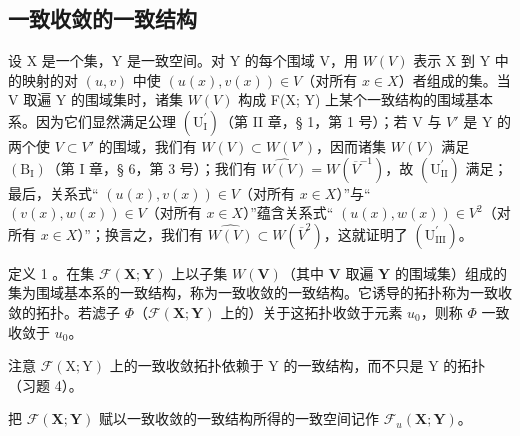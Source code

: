 \subsection{一致收敛的一致结构}

设 X 是一个集，Y 是一致空间。对 Y 的每个围域 V，用 \(W(V)\) 表示 X 到 Y 中的映射的对 \((u, v)\) 中使 \((u(x), v(x)) \in V\)（对所有 \(x \in X\)）者组成的集。当 V 取遍 Y 的围域集时，诸集 \(W(V)\) 构成 F(X; Y) 上某个一致结构的围域基本系。因为它们显然满足公理 \((\mathrm{U}_{\mathrm{I}}^{\prime})\)（第 II 章，§ 1，第 1 号）；若 V 与 \(V'\) 是 Y 的两个使 \(V \subset V'\) 的围域，我们有 \(W(V) \subset W(V')\)，因而诸集 \(W(V)\) 满足 \((\mathrm{B}_{\mathrm{I}})\)（第 I 章，§ 6，第 3 号）；我们有 \(\widehat{W(V)} = W(\overline{V}^{-1})\)，故 \((\mathrm{U}_{\mathrm{II}}^{\prime})\) 满足；最后，关系式`` \((u(x), v(x)) \in V\)（对所有 \(x \in X\)）''与`` \((v(x), w(x)) \in V\)（对所有 \(x \in X\)）''蕴含关系式`` \((u(x), w(x)) \in V^{2}\)（对所有 \(x \in X\)）''；换言之，我们有 \(\widehat{W(V)} \subset W(\overline{V}^{2})\)，这就证明了 \((\mathrm{U}_{\mathrm{III}}^{\prime})\)。

定义 1 。在集 \(\mathcal{F}(\mathbf{X};\mathbf{Y})\) 上以子集 \(W(\mathbf{V})\)（其中 \(\mathbf{V}\) 取遍 \(\mathbf{Y}\) 的围域集）组成的集为围域基本系的一致结构，称为一致收敛的一致结构。它诱导的拓扑称为一致收敛的拓扑。若滤子 \(\Phi\)（\(\mathcal{F}(\mathbf{X};\mathbf{Y})\) 上的）关于这拓扑收敛于元素 \(u_0\)，则称 \(\Phi\) 一致收敛于 \(u_0\)。

注意 \(\mathcal{F}(\mathrm{X};\mathrm{Y})\) 上的一致收敛拓扑依赖于 Y 的一致结构，而不只是 Y 的拓扑（习题 4）。

把 \(\mathcal{F}(\mathbf{X};\mathbf{Y})\) 赋以一致收敛的一致结构所得的一致空间记作 \(\mathcal{F}_u(\mathbf{X};\mathbf{Y})\)。

